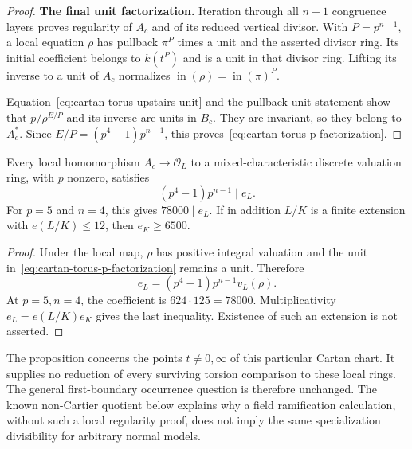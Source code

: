\begin{proof}
\par\medskip\noindent\textbf{The final unit factorization.}\enspace
Iteration through all $n-1$ congruence layers proves regularity of $A_c$ and of its reduced vertical divisor. With $P=p^{n-1}$, a local equation $\rho$ has pullback $\pi^P$ times a unit and the asserted divisor ring. Its initial coefficient belongs to $k(t^P)$ and is a unit in that divisor ring. Lifting its inverse to a unit of $A_c$ normalizes $\operatorname{in}(\rho)=\operatorname{in}(\pi)^P$.

Equation~\eqref{eq:cartan-torus-upstairs-unit} and the pullback-unit statement show that $p/\rho^{E/P}$ and its inverse are units in $B_c$. They are invariant, so they belong to $A_c^*$. Since $E/P=(p^4-1)p^{n-1}$, this proves~\eqref{eq:cartan-torus-p-factorization}.
\end{proof}

\begin{corollary}\label{cor:cartan-torus-specialization}
Every local homomorphism $A_c\to\mathcal O_L$ to a mixed-characteristic discrete valuation ring, with $p$ nonzero, satisfies
\[
 (p^4-1)p^{n-1}\mid e_L.
\]
For $p=5$ and $n=4$, this gives $78000\mid e_L$. If in addition $L/K$ is a finite extension with $e(L/K)\le12$, then $e_K\ge6500$.
\end{corollary}
\begin{proof}
Under the local map, $\rho$ has positive integral valuation and the unit in~\eqref{eq:cartan-torus-p-factorization} remains a unit. Therefore
\[
 e_L=(p^4-1)p^{n-1}v_L(\rho).
\]
At $p=5,n=4$, the coefficient is $624\cdot125=78000$. Multiplicativity $e_L=e(L/K)e_K$ gives the last inequality. Existence of such an extension is not asserted.
\end{proof}

The proposition concerns the points $t\ne0,\infty$ of this particular Cartan chart. It supplies no reduction of every surviving torsion comparison to these local rings. The general first-boundary occurrence question is therefore unchanged. The known non-Cartier quotient below explains why a field ramification calculation, without such a local regularity proof, does not imply the same specialization divisibility for arbitrary normal models.

